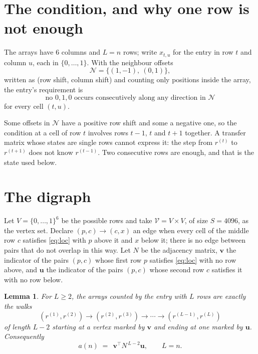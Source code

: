 \documentclass[11pt,a4paper]{article}
\theoremstyle{plain}
\newtheorem{lemma}[theorem]{Lemma}
\theoremstyle{definition}
\begin{document}
\section{The condition, and why one row is not enough}

The arrays have $6$ columns and $L=n$ rows; write $x_{t,u}$ for the entry in
row $t$ and column $u$, each in $\{0,\dots,1\}$. With the neighbour offsets
\[
\mathcal N=\{(1,-1),\ (0,1)\},
\]
written as (row shift, column shift) and counting only positions inside the array, the
entry's requirement is
\begin{equation}\label{eq:loc}
\text{no }0,1,0\text{ occurs consecutively along any direction in }\mathcal N
\end{equation}
for every cell $(t,u)$.

Some offsets in $\mathcal N$ have a positive row shift and some a negative one, so the
condition at a cell of row $t$ involves rows $t-1$, $t$ and $t+1$ together. A transfer
matrix whose states are single rows cannot express it: the step from $r^{(t)}$ to
$r^{(t+1)}$ does not know $r^{(t-1)}$. Two consecutive rows are enough, and that is
the state used below.

\section{The digraph}

Let $V=\{0,\dots,1\}^{6}$ be the possible rows and take
$\mathcal V=V\times V$, of size $S=4096$, as the vertex set. Declare $(p,c)\to(c,x)$ an edge
when every cell of the middle row $c$ satisfies \eqref{eq:loc} with $p$ above it and $x$
below it; there is no edge between pairs that do not overlap in this way. Let $N$ be the
adjacency matrix, $\mathbf{v}$ the indicator of the pairs $(p,c)$ whose first row $p$
satisfies \eqref{eq:loc} with no row above, and $\mathbf{u}$ the indicator of
the pairs $(p,c)$ whose second row $c$ satisfies it with no row below.

\begin{lemma}\label{lem:walk}
For $L\ge2$, the arrays counted by the entry with $L$ rows are exactly the walks
\[
(r^{(1)},r^{(2)})\to(r^{(2)},r^{(3)})\to\cdots\to(r^{(L-1)},r^{(L)})
\]
of length $L-2$ starting at a vertex marked by $\mathbf{v}$ and ending at one marked by
$\mathbf{u}$. Consequently
\[
a(n)\;=\;\,\mathbf{v}^{\!\top}N^{\,L-2}\mathbf{u},\qquad L=n .
\]
\end{lemma}
\end{document}
